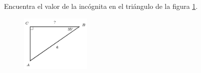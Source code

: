 Encuentra el valor de la incógnita en el triángulo de la figura \ref{fig:lados_functrig_15}.
\begin{figure}[H]
    \begin{center}
        \includegraphics[width=0.3\textwidth]{../images/lados_functrig_15.png}
    \end{center}
    \caption{}
    \label{fig:lados_functrig_15}
\end{figure}